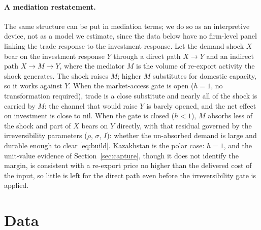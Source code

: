 \documentclass[12pt]{article}
\begin{document}
\paragraph{A mediation restatement.} The same structure can be put in mediation terms; we do
so as an interpretive device, not as a model we estimate, since the data below have no
firm-level panel linking the trade response to the investment response. Let the demand shock $X$ bear on
the investment response $Y$ through a direct path $X \to Y$ and an indirect path
$X \to M \to Y$, where the mediator $M$ is the volume of re-export activity the shock
generates. The shock raises $M$; higher $M$ substitutes for domestic capacity, so it works
against $Y$. When the market-access gate is open ($h = 1$, no transformation required), trade
is a close substitute and nearly all of the shock is carried by $M$: the channel that would
raise $Y$ is barely opened, and the net effect on investment is close to nil. When the gate is
closed ($h < 1$), $M$ absorbs less of the shock and part of $X$ bears on $Y$ directly, with
that residual governed by the irreversibility parameters ($\rho$, $\sigma$, $I$): whether the
un-absorbed demand is large and durable enough to clear \eqref{eq:build}. Kazakhstan is the
polar case: $h = 1$, and the unit-value evidence of Section~\ref{sec:capture}, though it does
not identify the margin, is consistent with a re-export price no higher than the delivered
cost of the input, so little is left for the direct path even before the irreversibility gate
is applied.

\section{Data}\label{sec:data}
\end{document}
